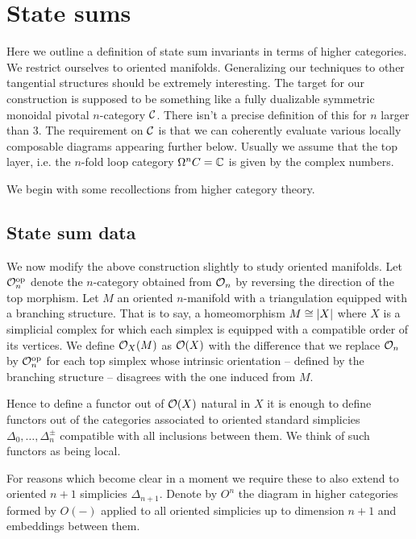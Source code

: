 
\section{State sums}

Here we outline a definition of state sum invariants in terms of higher categories.
We restrict ourselves to oriented manifolds.
Generalizing our techniques to other tangential structures should be extremely interesting.
The target for our construction is supposed to be something like a fully dualizable symmetric monoidal pivotal $n$-category $\mathcal{C}$.
There isn't a precise definition of this for $n$ larger than 3. The requirement on $\mathcal{C}$ is that we can coherently evaluate various locally composable diagrams appearing further below.
Usually we assume that the top layer, i.e.
the $n$-fold loop category $\Omega^n C = \mathbb{C} $ is given by the complex numbers.

We begin with some recollections from higher category theory.

\subsection{State sum data}

We now modify the above construction slightly to study oriented manifolds.
Let $\mathcal{O}_n^{\mathrm{op}}$ denote the $n$-category obtained from $\mathcal{O}_n$ by reversing the direction of the top morphism.
Let $M$ an oriented $n$-manifold with a triangulation equipped with a branching structure.
That is to say, a homeomorphism $M \cong \lvert X\rvert$ where $X$ is a simplicial complex for which each simplex is equipped with a compatible order of its vertices.
We define $\mathcal{O}_X(M)$ as $\mathcal{O}(X)$ with the difference that we replace $\mathcal{O}_n$ by $\mathcal{O}_n^{\mathrm{op}}$ for each top simplex whose intrinsic orientation -- defined by the branching structure -- disagrees with the one induced from $M$.

Hence to define a functor out of $\mathcal{O}(X)$ natural in $X$ it is enough to define functors out of the categories associated to oriented standard simplicies $\Delta_0, \dots, \Delta_n^\pm$ compatible with all inclusions between them.
We think of such functors as being local.

For reasons which become clear in a moment we require these to also extend to oriented $n+1$ simplicies $\Delta_{n+1}$.
Denote by $O^n$ the diagram in higher categories formed by $O(-)$ applied to all oriented simplicies up to dimension $n+1$ and embeddings between them.

